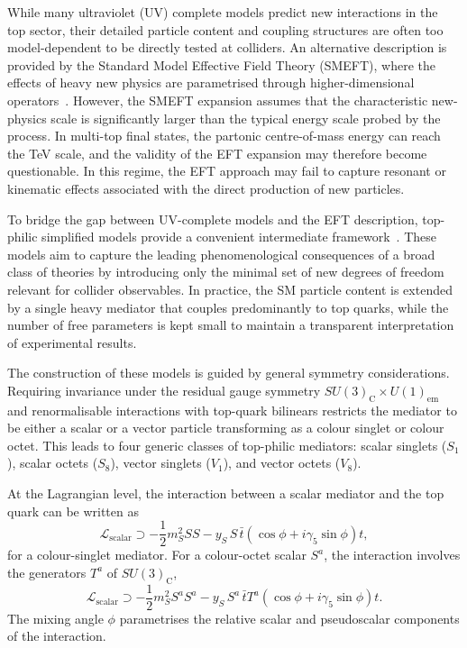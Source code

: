 While many ultraviolet (UV) complete models predict new interactions in the~\cite{BattagliaServant2010FourTop,LillieShuTait2008TopCompositeness,Gerbush2008ColorOctet,SalamStrathdee1975SUSYFermionNumber}
top sector, their detailed particle content and coupling structures are often 
too model-dependent to be directly tested at colliders. 
An alternative description is provided by the Standard Model Effective Field 
Theory (SMEFT), where the effects of heavy new physics are parametrised through 
higher-dimensional operators~\cite{Agram2013TopAnomalous,DHondt2018PinpointOperators,Banelli2021FourTopOperators}. 
However, the SMEFT expansion assumes that the characteristic new-physics scale 
is significantly larger than the typical energy scale probed by the process. 
In multi-top final states, the partonic centre-of-mass energy can reach the 
TeV scale, and the validity of the EFT expansion may therefore become questionable. 
In this regime, the EFT approach may fail to capture resonant or kinematic 
effects associated with the direct production of new particles.

To bridge the gap between UV-complete models and the EFT description, 
top-philic simplified models provide a convenient intermediate framework~\cite{Darme:2021gtt}. 
These models aim to capture the leading phenomenological consequences of a 
broad class of theories by introducing only the minimal set of new degrees of 
freedom relevant for collider observables. 
In practice, the SM particle content is extended by a single heavy mediator 
that couples predominantly to top quarks, while the number of free parameters 
is kept small to maintain a transparent interpretation of experimental results.

The construction of these models is guided by general symmetry considerations. 
Requiring invariance under the residual gauge symmetry 
$SU(3)_\mathrm{C} \times U(1)_\mathrm{em}$ and renormalisable interactions 
with top-quark bilinears restricts the mediator to be either a scalar or a 
vector particle transforming as a colour singlet or colour octet. 
This leads to four generic classes of top-philic mediators: scalar singlets 
($S_1$), scalar octets ($S_8$), vector singlets ($V_1$), and vector octets ($V_8$).

At the Lagrangian level, the interaction between a scalar mediator and the 
top quark can be written as
\begin{equation}
\mathcal{L}_{\text{scalar}} \supset
-\frac{1}{2} m_S^2 S S
- y_S\, S\, \bar{t}\left(\cos\phi + i\gamma_5\sin\phi\right)t ,
\end{equation}
for a colour-singlet mediator. 
For a colour-octet scalar $S^a$, the interaction involves the generators 
$T^a$ of $SU(3)_\mathrm{C}$,
\begin{equation}
\mathcal{L}_{\text{scalar}} \supset
-\frac{1}{2} m_S^2 S^a S^a
- y_S\, S^a\, \bar{t}T^a\left(\cos\phi + i\gamma_5\sin\phi\right)t .
\end{equation}
The mixing angle $\phi$ parametrises the relative scalar and pseudoscalar 
components of the interaction.

